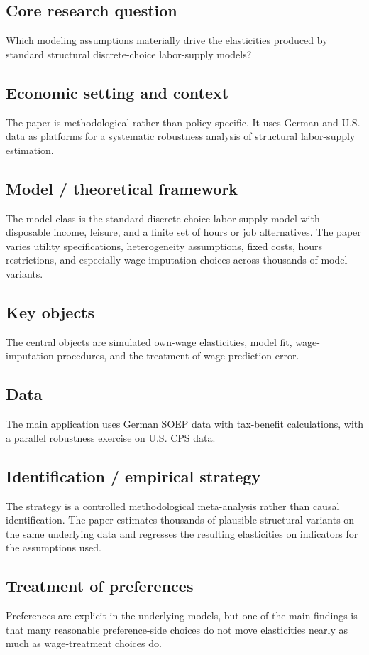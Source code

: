 \documentclass[11pt,a4paper]{article}
\begin{document}
\subsection*{Core research question}
Which modeling assumptions materially drive the elasticities produced by standard structural discrete-choice labor-supply models?

\subsection*{Economic setting and context}
The paper is methodological rather than policy-specific. It uses German and U.S. data as platforms for a systematic robustness analysis of structural labor-supply estimation.

\subsection*{Model / theoretical framework}
The model class is the standard discrete-choice labor-supply model with disposable income, leisure, and a finite set of hours or job alternatives. The paper varies utility specifications, heterogeneity assumptions, fixed costs, hours restrictions, and especially wage-imputation choices across thousands of model variants.

\subsection*{Key objects}
The central objects are simulated own-wage elasticities, model fit, wage-imputation procedures, and the treatment of wage prediction error.

\subsection*{Data}
The main application uses German SOEP data with tax-benefit calculations, with a parallel robustness exercise on U.S. CPS data.

\subsection*{Identification / empirical strategy}
The strategy is a controlled methodological meta-analysis rather than causal identification. The paper estimates thousands of plausible structural variants on the same underlying data and regresses the resulting elasticities on indicators for the assumptions used.

\subsection*{Treatment of preferences}
Preferences are explicit in the underlying models, but one of the main findings is that many reasonable preference-side choices do not move elasticities nearly as much as wage-treatment choices do.
\end{document}
